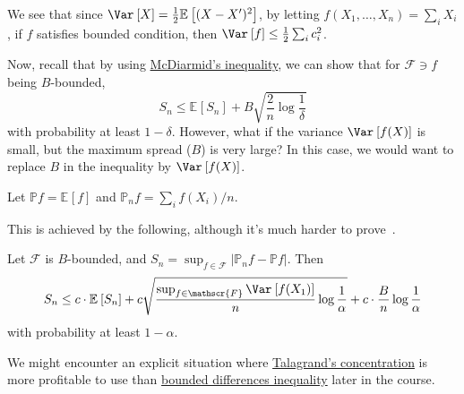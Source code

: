 \begin{note}
	We see that since \(\Var_{}\left[X \right] = \frac{1}{2}\mathbb{E}_{}\left[(X-X^{\prime} )^2 \right]\), by letting \(f(X_1, \dots , X_n) = \sum_{i} X_i\), if \(f\) satisfies bounded condition, then \(\Var_{}\left[f \right] \leq \frac{1}{2}\sum_{i} c_i^2\).
\end{note}

Now, recall that by using \hyperref[thm:McDiarmid-inequality]{McDiarmid's inequality}, we can show that for \(\mathscr{F} \ni f\) being \(B\)-bounded,
\[
	S_n \leq \mathbb{E}_{}\left[S_n \right] + B \sqrt{\frac{2}{n}\log \frac{1}{\delta }}
\]
with probability at least \(1 - \delta \). However, what if the variance \(\Var_{}\left[f(X) \right] \) is small, but the maximum spread (\(B\)) is very large? In this case, we would want to replace \(B\) in the inequality by \(\Var_{}\left[f(X) \right] \).

\begin{notation}
	Let \(\mathbb{P} f = \mathbb{E}_{}\left[f \right] \) and \(\mathbb{P} _n f = \sum_{i} f(X_i) / n\).
\end{notation}

This is achieved by the following, although it's much harder to prove~\cite[]{boucheron2013concentration}.

\begin{theorem}\label{thm:Talagrand-concentration-inequality}
	Let \(\mathscr{F} \) is \(B\)-bounded, and \(S_n = \sup _{f\in \mathscr{F}} \vert \mathbb{P} _n f - \mathbb{P} f \vert \). Then
	\[
		S_n \leq c\cdot \mathbb{E}_{}\left[S_n \right] + c \sqrt{\frac{\sup_{f\in \mathscr{F}} \Var_{}\left[f(X_1) \right] }{n} \log \frac{1}{\alpha }} + c\cdot \frac{B}{n} \log \frac{1}{\alpha }
	\]
	with probability at least \(1 - \alpha \).
\end{theorem}

\begin{remark}
	We might encounter an explicit situation where \hyperref[thm:Talagrand-concentration-inequality]{Talagrand's concentration} is more profitable to use than \hyperref[thm:McDiarmid-inequality]{bounded differences inequality} later in the course.
\end{remark}